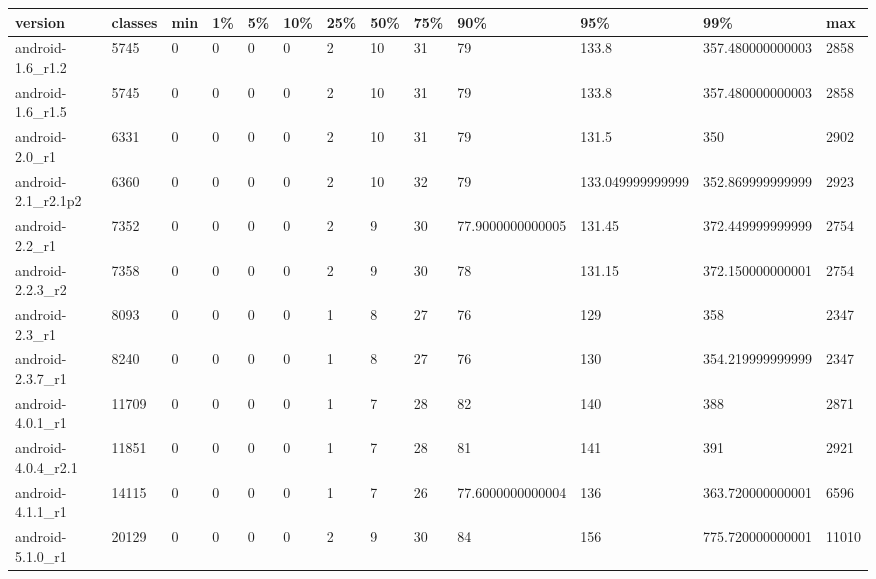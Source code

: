 \begin{tabular}{|l|l|l|l|l|l|l|l|l|l|l|l|l|}
\hline
version&classes&min&1\%&5\%&10\%&25\%&50\%&75\%&90\%&95\%&99\%&max\\
\hline
android-1.6\_r1.2&5745&0&0&0&0&2&10&31&79&133.8&357.480000000003&2858\\
\hline
android-1.6\_r1.5&5745&0&0&0&0&2&10&31&79&133.8&357.480000000003&2858\\
\hline
android-2.0\_r1&6331&0&0&0&0&2&10&31&79&131.5&350&2902\\
\hline
android-2.1\_r2.1p2&6360&0&0&0&0&2&10&32&79&133.049999999999&352.869999999999&2923\\
\hline
android-2.2\_r1&7352&0&0&0&0&2&9&30&77.9000000000005&131.45&372.449999999999&2754\\
\hline
android-2.2.3\_r2&7358&0&0&0&0&2&9&30&78&131.15&372.150000000001&2754\\
\hline
android-2.3\_r1&8093&0&0&0&0&1&8&27&76&129&358&2347\\
\hline
android-2.3.7\_r1&8240&0&0&0&0&1&8&27&76&130&354.219999999999&2347\\
\hline
android-4.0.1\_r1&11709&0&0&0&0&1&7&28&82&140&388&2871\\
\hline
android-4.0.4\_r2.1&11851&0&0&0&0&1&7&28&81&141&391&2921\\
\hline
android-4.1.1\_r1&14115&0&0&0&0&1&7&26&77.6000000000004&136&363.720000000001&6596\\
\hline
android-5.1.0\_r1&20129&0&0&0&0&2&9&30&84&156&775.720000000001&11010\\
\hline
\end{tabular}
